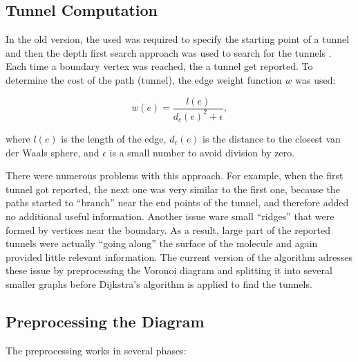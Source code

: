\documentclass[11pt]{article} %
\begin{document}
\subsection{Tunnel Computation}
In the old version, the used was required to specify the starting point of a tunnel and then the depth first search approach was used to search for the tunnels \cite{mole}. Each time a boundary vertex was reached, the a tunnel get reported. To determine the cost of the path (tunnel), the edge weight function $w$ was used: 

\[
w(e)=\frac{l(e)}{d_c(e)^2+\epsilon},
\]

where $l(e)$ is the length of the edge, $d_c(e)$ is the distance to the closest van der Waals sphere, and $\epsilon$ is a small number to avoid division by zero.

There were numerous problems with this approach. For example, when the first tunnel got reported, the next one was very similar to the first one, because the paths started to ``branch'' near the end points of the tunnel, and therefore added no additional useful information. Another issue ware small ``ridges'' that were formed by vertices near the boundary. As a result, large part of the reported tunnels were actually ``going along'' the surface of the molecule and again provided little relevant information. The current version of the algorithm adresses these issue by preprocessing the Voronoi diagram and splitting it into several smaller graphs before Dijkstra's algorithm is applied to find the tunnels.

\subsection{Preprocessing the Diagram}

The preprocessing works in several phases:
\end{document}
